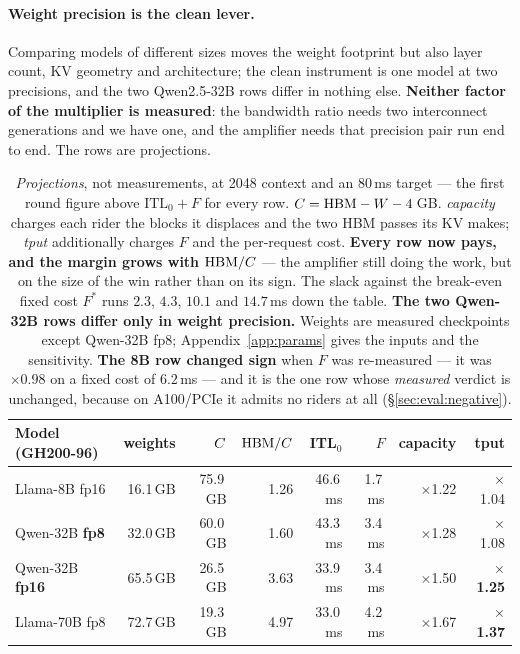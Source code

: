 \paragraph{Weight precision is the clean lever.} Comparing models of different
sizes moves the weight footprint but also layer count, KV geometry and
architecture; the clean instrument is one model at two precisions, and the two
Qwen2.5-32B rows differ in nothing else. \textbf{Neither factor of the multiplier
is measured}: the bandwidth ratio needs two interconnect generations and we have
one, and the amplifier needs that precision pair run end to end. The rows are
projections.

\begin{table}[t]
\centering
\small
\begin{tabular}{lrrrrrrr}
\toprule
Model (GH200-96) & weights & $C$ & $\mathrm{HBM}/C$ & ITL$_0$ & $F$ & capacity & tput \\
\midrule
Llama-8B fp16          & 16.1\,GB & 75.9\,GB & 1.26 & 46.6\,ms & \phantom{0}1.7\,ms & $\times$1.22 & $\times$1.04 \\
Qwen-32B \textbf{fp8}  & 32.0\,GB & 60.0\,GB & 1.60 & 43.3\,ms & \phantom{0}3.4\,ms & $\times$1.28 & $\times$1.08 \\
Qwen-32B \textbf{fp16} & 65.5\,GB & 26.5\,GB & 3.63 & 33.9\,ms & \phantom{0}3.4\,ms & $\times$1.50 & $\times$\textbf{1.25} \\
Llama-70B fp8          & 72.7\,GB & 19.3\,GB & 4.97 & 33.0\,ms & \phantom{0}4.2\,ms & $\times$1.67 & $\times$\textbf{1.37} \\
\bottomrule
\end{tabular}
\caption{\emph{Projections}, not measurements, at 2048 context and an 80\,ms target
--- the first round figure above $\mathrm{ITL}_0 + F$ for every row.
$C = \mathrm{HBM} - W - 4$\,GB. \emph{capacity} charges each rider the blocks it
displaces and the two HBM passes its KV makes; \emph{tput} additionally charges $F$
and the per-request cost. \textbf{Every row now pays, and the margin grows with
$\mathrm{HBM}/C$} --- the amplifier still doing the work, but on the size of the win
rather than on its sign. The slack against the break-even fixed cost $F^{*}$ runs
$2.3$, $4.3$, $10.1$ and $14.7$\,ms down the table.
\textbf{The two Qwen-32B rows differ only in weight precision.} Weights are
measured checkpoints except Qwen-32B fp8; Appendix~\ref{app:params} gives the
inputs and the sensitivity.
\textbf{The 8B row changed sign} when $F$ was re-measured --- it was
$\times 0.98$ on a fixed cost of $6.2$\,ms --- and it is the one row whose
\emph{measured} verdict is unchanged, because on A100/PCIe it admits no riders at
all (\S\ref{sec:eval:negative}).}
\label{tab:gain}
\end{table}

